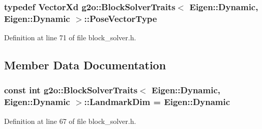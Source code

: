 \subsubsection[{\texorpdfstring{Pose\+Vector\+Type}{PoseVectorType}}]{\setlength{\rightskip}{0pt plus 5cm}typedef Vector\+Xd {\bf g2o\+::\+Block\+Solver\+Traits}$<$ Eigen\+::\+Dynamic, Eigen\+::\+Dynamic $>$\+::{\bf Pose\+Vector\+Type}}\hypertarget{structg2o_1_1BlockSolverTraits_3_01Eigen_1_1Dynamic_00_01Eigen_1_1Dynamic_01_4_ae8ae50131f5aeaf97c844e20960ebaf3}{}\label{structg2o_1_1BlockSolverTraits_3_01Eigen_1_1Dynamic_00_01Eigen_1_1Dynamic_01_4_ae8ae50131f5aeaf97c844e20960ebaf3}


Definition at line 71 of file block\+\_\+solver.\+h.



\subsection{Member Data Documentation}
\subsubsection[{\texorpdfstring{Landmark\+Dim}{LandmarkDim}}]{\setlength{\rightskip}{0pt plus 5cm}const int {\bf g2o\+::\+Block\+Solver\+Traits}$<$ Eigen\+::\+Dynamic, Eigen\+::\+Dynamic $>$\+::Landmark\+Dim = Eigen\+::\+Dynamic\hspace{0.3cm}{\ttfamily [static]}}\hypertarget{structg2o_1_1BlockSolverTraits_3_01Eigen_1_1Dynamic_00_01Eigen_1_1Dynamic_01_4_aa8f7b7c3fc1ce4a7d61e925e3067e196}{}\label{structg2o_1_1BlockSolverTraits_3_01Eigen_1_1Dynamic_00_01Eigen_1_1Dynamic_01_4_aa8f7b7c3fc1ce4a7d61e925e3067e196}


Definition at line 67 of file block\+\_\+solver.\+h.

